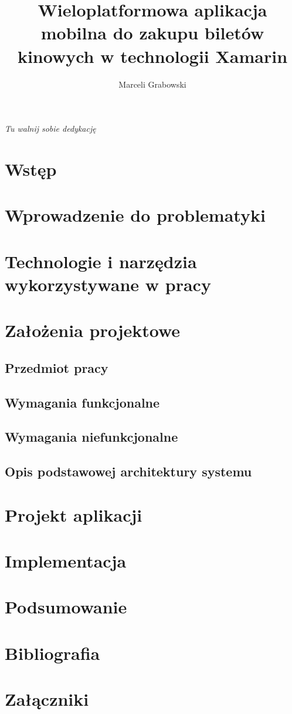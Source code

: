 \documentclass[12pt,a4paper]{report}
\author{Marceli Grabowski}
\title{Wieloplatformowa aplikacja mobilna do zakupu biletów kinowych w technologii Xamarin}
\begin{document}

\tableofcontents{}

\clearpage
{}
\clearpage

\begin{flushright}
\vspace*{\fill}
\textit{Tu walnij sobie dedykację}
\end{flushright}

\pagebreak

\chapter*{Wstęp}
\chapter{Wprowadzenie do problematyki}
\chapter{Technologie i narzędzia wykorzystywane w pracy}
\chapter{Założenia projektowe}
\section{Przedmiot pracy}
\section{Wymagania funkcjonalne}
\section{Wymagania niefunkcjonalne}
\section{Opis podstawowej architektury systemu}
\chapter{Projekt aplikacji}
\chapter{Implementacja}
\chapter{Podsumowanie}
\chapter*{Bibliografia}
\chapter*{Załączniki}
\end{document}
